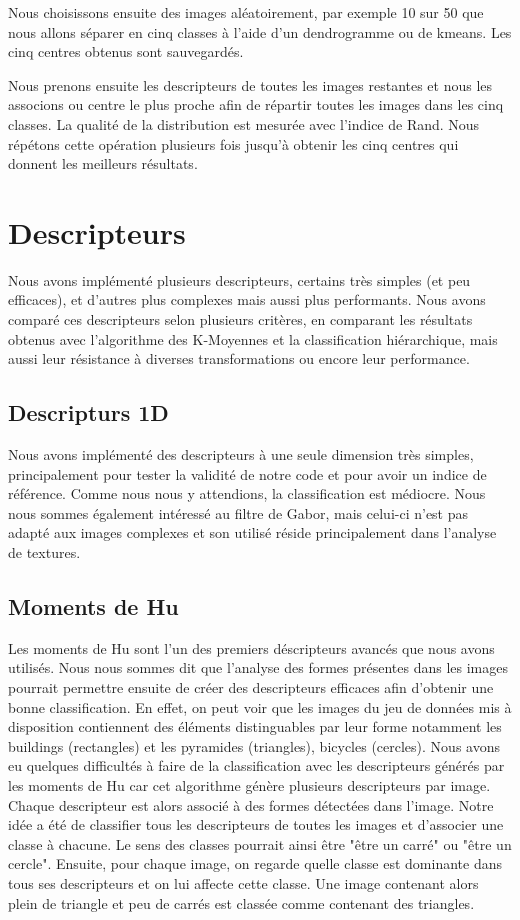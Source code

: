 \documentclass[12pt,a4paper,utf8x]{report}
\begin{document}
    Nous choisissons ensuite des images aléatoirement, par exemple 10 sur 50 que nous allons séparer en cinq classes à l'aide d'un dendrogramme ou de kmeans. Les cinq centres obtenus sont sauvegardés.

    Nous prenons ensuite les descripteurs de toutes les images restantes et nous les associons ou centre le plus proche afin de répartir toutes les images dans les cinq classes. La qualité de la distribution est mesurée avec l'indice de Rand. Nous répétons cette opération plusieurs fois jusqu'à obtenir les cinq centres qui donnent les meilleurs résultats.


\chapter{Descripteurs}
    Nous avons implémenté plusieurs descripteurs, certains très simples (et peu efficaces), et d'autres plus complexes mais aussi plus performants. Nous avons comparé ces descripteurs selon plusieurs critères, en comparant les résultats obtenus avec l'algorithme des K-Moyennes et la classification hiérarchique, mais aussi leur résistance à diverses transformations ou encore leur performance.

    \section{Descripturs 1D}
        Nous avons implémenté des descripteurs à une seule dimension très simples, principalement pour tester la validité de notre code et pour avoir un indice de référence. Comme nous nous y attendions, la classification est médiocre. Nous nous sommes également intéressé au filtre de Gabor, mais celui-ci n'est pas adapté aux images complexes et son utilisé réside principalement dans l'analyse de textures.

    \section{Moments de Hu}

        Les moments de Hu sont l'un des premiers déscripteurs avancés que nous avons utilisés. Nous nous sommes dit que l'analyse des formes présentes dans les images pourrait permettre ensuite de créer des descripteurs efficaces afin d'obtenir une bonne classification. En effet, on peut voir que les images du jeu de données mis à disposition contiennent des éléments distinguables par leur forme notamment les buildings (rectangles) et les pyramides (triangles), bicycles (cercles). Nous avons eu quelques difficultés à faire de la classification avec les descripteurs générés par les moments de Hu car cet algorithme génère plusieurs descripteurs par image. Chaque descripteur est alors associé à des formes détectées dans l'image. Notre idée a été de classifier tous les descripteurs de toutes les images et d'associer une classe à chacune. Le sens des classes pourrait ainsi être "être un carré" ou "être un cercle". Ensuite, pour chaque image, on regarde quelle classe est dominante dans tous ses descripteurs et on lui affecte cette classe. Une image contenant alors plein de triangle et peu de carrés est classée comme contenant des triangles.
\end{document}
